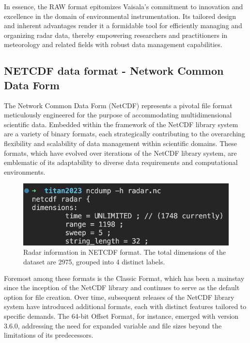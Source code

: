 In essence, the RAW format epitomizes Vaisala's commitment to innovation and
excellence in the domain of environmental instrumentation. Its tailored design
and inherent advantages render it a formidable tool for efficiently managing and
organizing radar data, thereby empowering researchers and practitioners in
meteorology and related fields with robust data management capabilities.

\subsection{NETCDF data format - Network Common Data Form}

The Network Common Data Form (NetCDF) \cite{netcdf} represents a pivotal file
format meticulously engineered for the purpose of accommodating multidimensional
scientific data. Embedded within the framework of the NetCDF library system are
a variety of binary formats, each strategically contributing to the overarching
flexibility and scalability of data management within scientific domains. These
formats, which have evolved over iterations of the NetCDF library system, are
emblematic of its adaptability to diverse data requirements and computational
environments.

\begin{figure}[H]
    \centering
    \includegraphics[width=1\linewidth]{Images/ncdump.png}
    \vspace{1em}
    \caption{Radar information in NETCDF format. The total dimensions of the dataset are 2975, grouped into 4 distinct labels.}
    \label{fig:enter-label}
\end{figure}


Foremost among these formats is the Classic Format, which has been a mainstay
since the inception of the NetCDF library and continues to serve as the default
option for file creation. Over time, subsequent releases of the NetCDF library
system have introduced additional formats, each with distinct features tailored
to specific demands. The 64-bit Offset Format, for instance, emerged with
version 3.6.0, addressing the need for expanded variable and file sizes beyond
the limitations of its predecessors.

